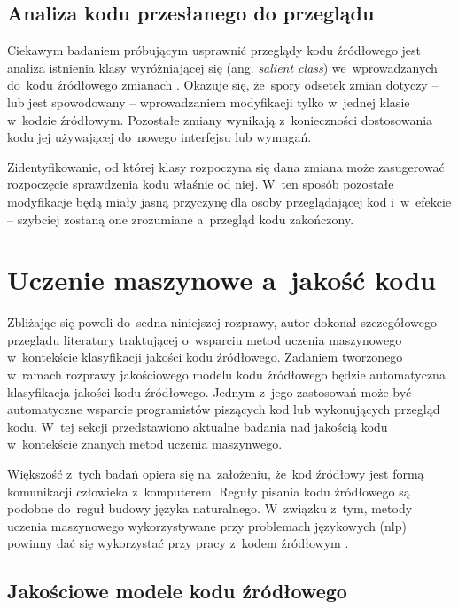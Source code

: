 \documentclass[twoside]{praca}
\begin{document}
\subsection{Analiza kodu przesłanego do przeglądu}

Ciekawym badaniem próbującym usprawnić przeglądy kodu źródłowego jest analiza istnienia klasy wyróżniającej się (ang. \textit{salient class}) we~wprowadzanych do~kodu źródłowego zmianach \cite{huang2018salient}. Okazuje się, że~spory odsetek zmian dotyczy -- lub jest spowodowany -- wprowadzaniem modyfikacji tylko w~jednej klasie w~kodzie źródłowym. Pozostałe zmiany wynikają z~konieczności dostosowania kodu jej używającej do~nowego interfejsu lub wymagań.

Zidentyfikowanie, od której klasy rozpoczyna się dana zmiana może zasugerować rozpoczęcie sprawdzenia kodu właśnie od niej. W~ten sposób pozostałe modyfikacje będą miały jasną przyczynę dla osoby przeglądającej kod i~w~efekcie -- szybciej zostaną one zrozumiane a~przegląd kodu zakończony.

\section{Uczenie maszynowe a~jakość kodu}
\label{sec:related:deep}

Zbliżając się powoli do~sedna niniejszej rozprawy, autor dokonał szczegółowego przeglądu literatury traktującej o~wsparciu metod uczenia maszynowego w~kontekście klasyfikacji jakości kodu źródłowego. Zadaniem tworzonego w~ramach rozprawy jakościowego modelu kodu źródłowego będzie automatyczna klasyfikacja jakości kodu źródłowego. Jednym z~jego zastosowań może być automatyczne wsparcie programistów piszących kod lub wykonujących przegląd kodu. W~tej sekcji przedstawiono aktualne badania nad jakością kodu w~kontekście znanych metod uczenia maszynwego.

Większość z~tych badań opiera się na~założeniu, że~kod źródłowy jest formą komunikacji człowieka z~komputerem. Reguły pisania kodu źródłowego są podobne do~reguł budowy języka naturalnego. W~związku z~tym, metody uczenia maszynowego wykorzystywane przy problemach językowych (\gls{nlp}) powinny dać się wykorzystać przy pracy z~kodem źródłowym \cite{allamanis2018survey}.

\subsection{Jakościowe modele kodu źródłowego}
\end{document}
